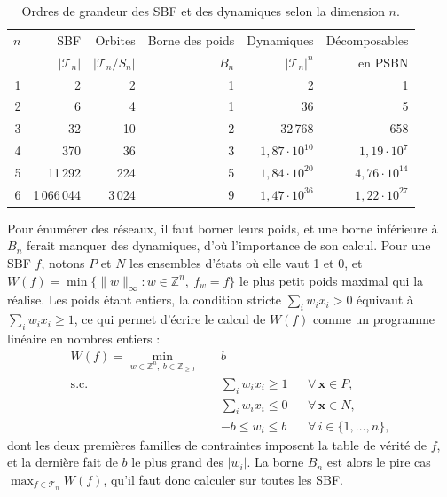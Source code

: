\documentclass[12pt, a4paper]{article}
\begin{document}
\begin{table}[H]
\centering
\caption{Ordres de grandeur des SBF et des dynamiques selon la dimension $n$.}
\label{tab:echelles}
\begin{tabular}{rrrrrr}
\toprule
$n$ & SBF & Orbites & Borne des poids & Dynamiques & Décomposables \\
 & $|\mathcal{T}_n|$ & $|\mathcal{T}_n/S_n|$ & $B_n$ & $|\mathcal{T}_n|^n$ & en PSBN \\
\midrule
1 & 2 & 2 & 1 & 2 & 1 \\
2 & 6 & 4 & 1 & 36 & 5 \\
3 & 32 & 10 & 2 & 32\,768 & 658 \\
4 & 370 & 36 & 3 & $1{,}87 \cdot 10^{10}$ & $1{,}19 \cdot 10^{7}$ \\
5 & 11\,292 & 224 & 5 & $1{,}84 \cdot 10^{20}$ & $4{,}76 \cdot 10^{14}$ \\
6 & 1\,066\,044 & 3\,024 & 9 & $1{,}47 \cdot 10^{36}$ & $1{,}22 \cdot 10^{27}$ \\
\bottomrule
\end{tabular}
\end{table}

Pour énumérer des réseaux, il faut borner leurs poids, et une borne inférieure à $B_n$ ferait manquer des dynamiques, d'où l'importance de son calcul.
Pour une SBF $f$, notons $P$ et $N$ les ensembles d'états où elle vaut 1 et 0, et $W(f) = \min\{ \|w\|_\infty : w \in \mathbb{Z}^n,\ f_w = f \}$ le plus petit poids maximal qui la réalise.
Les poids étant entiers, la condition stricte $\sum_i w_i x_i > 0$ équivaut à $\sum_i w_i x_i \ge 1$, ce qui permet d'écrire le calcul de $W(f)$ comme un programme linéaire en nombres entiers :
\begin{equation}
\begin{aligned}
W(f) = \min_{w \in \mathbb{Z}^n,\ b \in \mathbb{Z}_{\ge 0}}\quad & b\\
\text{s.c.}\quad
& \textstyle\sum_i w_i x_i \ge 1 && \forall\, \mathbf{x} \in P,\\
& \textstyle\sum_i w_i x_i \le 0 && \forall\, \mathbf{x} \in N,\\
& -b \le w_i \le b && \forall\, i \in \{1,\dots,n\},
\end{aligned}
\end{equation}
dont les deux premières familles de contraintes imposent la table de vérité de $f$, et la dernière fait de $b$ le plus grand des $|w_i|$.
La borne $B_n$ est alors le pire cas $\max_{f \in \mathcal{T}_n} W(f)$, qu'il faut donc calculer sur toutes les SBF.
\end{document}
